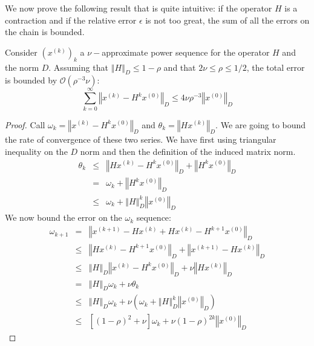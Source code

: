 We now prove the following result that is quite intuitive: if the
operator $H$ is a contraction and if the relative error $\epsilon$
is not too great, the sum of all the errors on the chain is bounded. 

\begin{lemma}\label{lem:nu-sequence-bound}Consider $\left(x^{\left(k\right)}\right)_{k}$
a $\nu-$approximate power sequence for the operator $H$ and the
norm $D$. Assuming that $\left\Vert H\right\Vert _{D}\leq1-\rho$
and that $2\nu\leq\rho\leq1/2$, the total error is bounded by $\mathcal{O}\left(\rho^{-3}\nu\right)$:
\[
\sum_{k=0}^{\infty}\left\Vert x^{\left(k\right)}-H^{k}x^{\left(0\right)}\right\Vert _{D}\leq4\nu\rho^{-3}\left\Vert x^{\left(0\right)}\right\Vert _{D}
\]
\end{lemma}

\begin{proof} Call $\omega_{k}=\left\Vert x^{\left(k\right)}-H^{k}x^{\left(0\right)}\right\Vert _{D}$
and $\theta_{k}=\left\Vert Hx^{\left(k\right)}\right\Vert _{D}$.
We are going to bound the rate of convergence of these two series.
We have first using triangular inequality on the $D$ norm and then
the definition of the induced matrix norm. 
\begin{eqnarray*}
\theta_{k} & \leq & \left\Vert Hx^{\left(k\right)}-H^{k}x^{\left(0\right)}\right\Vert _{D}+\left\Vert H^{k}x^{\left(0\right)}\right\Vert _{D}\\
 & = & \omega_{k}+\left\Vert H^{k}x^{\left(0\right)}\right\Vert _{D}\\
 & \leq & \omega_{k}+\left\Vert H\right\Vert _{D}^{k}\left\Vert x^{\left(0\right)}\right\Vert _{D}
\end{eqnarray*}
We now bound the error on the $\omega_{k}$ sequence: 
\begin{eqnarray*}
\omega_{k+1} & = & \left\Vert x^{\left(k+1\right)}-Hx^{\left(k\right)}+Hx^{\left(k\right)}-H^{k+1}x^{\left(0\right)}\right\Vert _{D}\\
 & \leq & \left\Vert Hx^{\left(k\right)}-H^{k+1}x^{\left(0\right)}\right\Vert _{D}+\left\Vert x^{\left(k+1\right)}-Hx^{\left(k\right)}\right\Vert _{D}\\
 & \leq & \left\Vert H\right\Vert _{D}\left\Vert x^{\left(k\right)}-H^{k}x^{\left(0\right)}\right\Vert _{D}+\nu\left\Vert Hx^{\left(k\right)}\right\Vert _{D}\\
 & = & \left\Vert H\right\Vert _{D}\omega_{k}+\nu\theta_{k}\\
 & \leq & \left\Vert H\right\Vert _{D}\omega_{k}+\nu\left(\omega_{k}+\left\Vert H\right\Vert _{D}^{k}\left\Vert x^{\left(0\right)}\right\Vert _{D}\right)\\
 & \leq & \left[\left(1-\rho\right)^{2}+\nu\right]\omega_{k}+\nu\left(1-\rho\right)^{2k}\left\Vert x^{\left(0\right)}\right\Vert _{D}
\end{eqnarray*}



\end{proof}
